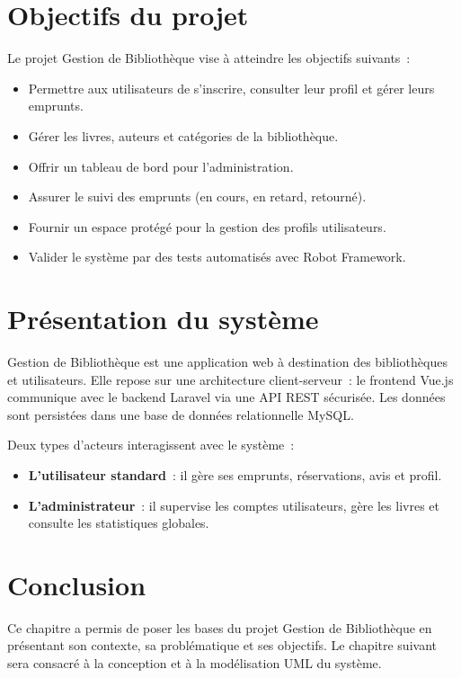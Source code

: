 \documentclass{rapportPFA}
\begin{document}
\section{Objectifs du projet}

Le projet Gestion de Bibliothèque vise à atteindre les objectifs suivants~:
\begin{itemize}
    \item Permettre aux utilisateurs de s'inscrire, consulter leur profil et gérer leurs emprunts.
    \item Gérer les livres, auteurs et catégories de la bibliothèque.
    \item Offrir un tableau de bord pour l'administration.
    \item Assurer le suivi des emprunts (en cours, en retard, retourné).
    \item Fournir un espace protégé pour la gestion des profils utilisateurs.
    \item Valider le système par des tests automatisés avec Robot Framework.
\end{itemize}

\section{Présentation du système}

Gestion de Bibliothèque est une application web à destination des bibliothèques et utilisateurs.
Elle repose sur une architecture client-serveur~: le frontend Vue.js communique avec le backend Laravel via
une API REST sécurisée. Les données sont persistées dans une base de données
relationnelle MySQL.

Deux types d'acteurs interagissent avec le système~:
\begin{itemize}
    \item \textbf{L'utilisateur standard}~: il gère ses emprunts, réservations, avis et profil.
    \item \textbf{L'administrateur}~: il supervise les comptes utilisateurs, gère les livres et
          consulte les statistiques globales.
\end{itemize}

\section{Conclusion}

Ce chapitre a permis de poser les bases du projet Gestion de Bibliothèque en présentant son contexte,
sa problématique et ses objectifs. Le chapitre suivant sera consacré à la conception
et à la modélisation UML du système.
\end{document}
